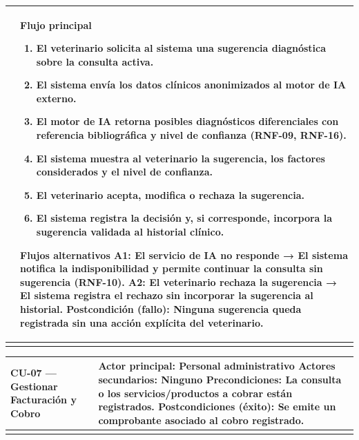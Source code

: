 \documentclass[
]{article}
\newcounter{none} %
\begin{document}
{\def\LTcaptype{none} %
\begin{longtable}[]{@{}
  >{\raggedright\arraybackslash}p{}
  >{\raggedright\arraybackslash}p{}@{}}
\toprule\noalign{}
\begin{minipage}[b]{\linewidth}\raggedright
\end{minipage} & \begin{minipage}[b]{\linewidth}\raggedright
\textbf{Flujo principal}

\begin{enumerate}
\def\labelenumi{\arabic{enumi}.}
\item
  El veterinario solicita al sistema una sugerencia diagnóstica sobre la
  consulta activa.
\item
  El sistema envía los datos clínicos anonimizados al motor de IA
  externo.
\item
  El motor de IA retorna posibles diagnósticos diferenciales con
  referencia bibliográfica y nivel de confianza (RNF-09, RNF-16).
\item
  El sistema muestra al veterinario la sugerencia, los factores
  considerados y el nivel de confianza.
\item
  El veterinario acepta, modifica o rechaza la sugerencia.
\item
  El sistema registra la decisión y, si corresponde, incorpora la
  sugerencia validada al historial clínico.
\end{enumerate}

\textbf{Flujos alternativos} A1: El servicio de IA no responde → El sistema notifica la
indisponibilidad y permite continuar la consulta sin sugerencia
(RNF-10). A2: El veterinario rechaza la sugerencia → El sistema registra el
rechazo sin incorporar la sugerencia al historial. \textbf{Postcondición (fallo):} Ninguna sugerencia queda registrada sin
una acción explícita del veterinario.
\end{minipage} \\
\midrule\noalign{}
\endhead
\bottomrule\noalign{}
\endlastfoot
\end{longtable}
}

{\def\LTcaptype{none} %
\begin{longtable}[]{@{}
  >{\raggedright\arraybackslash}p{}
  >{\raggedright\arraybackslash}p{}@{}}
\toprule\noalign{}
\begin{minipage}[b]{\linewidth}\raggedright
CU-07 --- Gestionar Facturación y Cobro
\end{minipage} & \begin{minipage}[b]{\linewidth}\raggedright
\textbf{Actor principal:} Personal administrativo \textbf{Actores
secundarios:} Ninguno \textbf{Precondiciones:} La consulta o los
servicios/productos a cobrar están registrados. \textbf{Postcondiciones (éxito):} Se emite un comprobante asociado al
cobro registrado.
\end{minipage} \\
\midrule\noalign{}
\endhead
\bottomrule\noalign{}
\endlastfoot
\end{longtable}
}
\end{document}
